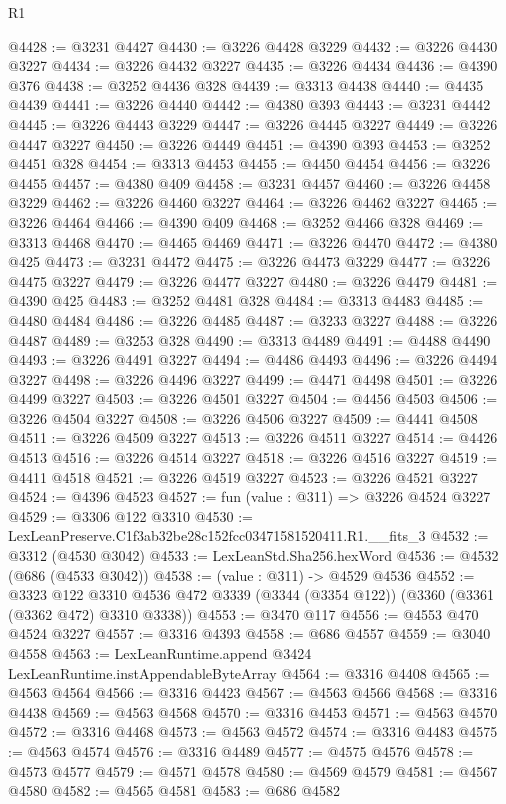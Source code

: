 \begin{lexlean}{R1}
\begin{coremodule}
@4428 := @3231 @4427
@4430 := @3226 @4428 @3229
@4432 := @3226 @4430 @3227
@4434 := @3226 @4432 @3227
@4435 := @3226 @4434
@4436 := @4390 @376
@4438 := @3252 @4436 @328
@4439 := @3313 @4438
@4440 := @4435 @4439
@4441 := @3226 @4440
@4442 := @4380 @393
@4443 := @3231 @4442
@4445 := @3226 @4443 @3229
@4447 := @3226 @4445 @3227
@4449 := @3226 @4447 @3227
@4450 := @3226 @4449
@4451 := @4390 @393
@4453 := @3252 @4451 @328
@4454 := @3313 @4453
@4455 := @4450 @4454
@4456 := @3226 @4455
@4457 := @4380 @409
@4458 := @3231 @4457
@4460 := @3226 @4458 @3229
@4462 := @3226 @4460 @3227
@4464 := @3226 @4462 @3227
@4465 := @3226 @4464
@4466 := @4390 @409
@4468 := @3252 @4466 @328
@4469 := @3313 @4468
@4470 := @4465 @4469
@4471 := @3226 @4470
@4472 := @4380 @425
@4473 := @3231 @4472
@4475 := @3226 @4473 @3229
@4477 := @3226 @4475 @3227
@4479 := @3226 @4477 @3227
@4480 := @3226 @4479
@4481 := @4390 @425
@4483 := @3252 @4481 @328
@4484 := @3313 @4483
@4485 := @4480 @4484
@4486 := @3226 @4485
@4487 := @3233 @3227
@4488 := @3226 @4487
@4489 := @3253 @328
@4490 := @3313 @4489
@4491 := @4488 @4490
@4493 := @3226 @4491 @3227
@4494 := @4486 @4493
@4496 := @3226 @4494 @3227
@4498 := @3226 @4496 @3227
@4499 := @4471 @4498
@4501 := @3226 @4499 @3227
@4503 := @3226 @4501 @3227
@4504 := @4456 @4503
@4506 := @3226 @4504 @3227
@4508 := @3226 @4506 @3227
@4509 := @4441 @4508
@4511 := @3226 @4509 @3227
@4513 := @3226 @4511 @3227
@4514 := @4426 @4513
@4516 := @3226 @4514 @3227
@4518 := @3226 @4516 @3227
@4519 := @4411 @4518
@4521 := @3226 @4519 @3227
@4523 := @3226 @4521 @3227
@4524 := @4396 @4523
@4527 := fun (value : @311) => @3226 @4524 @3227
@4529 := @3306 @122 @3310
@4530 := LexLeanPreserve.C1f3ab32be28c152fcc03471581520411.R1.__fits_3
@4532 := @3312 (@4530 @3042)
@4533 := LexLeanStd.Sha256.hexWord
@4536 := @4532 (@686 (@4533 @3042))
@4538 := (value : @311) -> @4529 @4536
@4552 := @3323
    @122
    @3310
    @4536
    @472
    @3339
    (@3344 (@3354 @122))
    (@3360 (@3361 (@3362 @472) @3310 @3338))
@4553 := @3470 @117
@4556 := @4553 @470 @4524 @3227
@4557 := @3316 @4393
@4558 := @686 @4557
@4559 := @3040 @4558
@4563 := LexLeanRuntime.append @3424 LexLeanRuntime.instAppendableByteArray
@4564 := @3316 @4408
@4565 := @4563 @4564
@4566 := @3316 @4423
@4567 := @4563 @4566
@4568 := @3316 @4438
@4569 := @4563 @4568
@4570 := @3316 @4453
@4571 := @4563 @4570
@4572 := @3316 @4468
@4573 := @4563 @4572
@4574 := @3316 @4483
@4575 := @4563 @4574
@4576 := @3316 @4489
@4577 := @4575 @4576
@4578 := @4573 @4577
@4579 := @4571 @4578
@4580 := @4569 @4579
@4581 := @4567 @4580
@4582 := @4565 @4581
@4583 := @686 @4582

\end{coremodule}
\end{lexlean}
